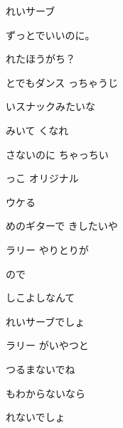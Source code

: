 \documentclass[a4paper,tate,twocolumn,12pt]{ltjtarticle}
\begin{document}
\thispagestyle{empty}

\begin{center}
{\LARGE {}れいサーブ}

{\large ずっとでいいのに。}
\end{center}

\vspace{1em}

\begin{flushleft}

\noindent\begin{minipage}{\linewidth}
れたほうがち？

とでもダンス っちゃうじ

いスナックみたいな

みいて くなれ
\end{minipage}

\vspace{2em}

\noindent\begin{minipage}{\linewidth}
さないのに ちゃっちい

っこ オリジナル

ウケる 

めのギターで きしたいや
\end{minipage}

\vspace{2em}

\noindent\begin{minipage}{\linewidth}
ラリー やりとりが

ので

しこよしなんて

れいサーブでしょ

ラリー がいやつと

つるまないでね

もわからないなら

れないでしょ
\end{minipage}


\end{flushleft}
\end{document}
